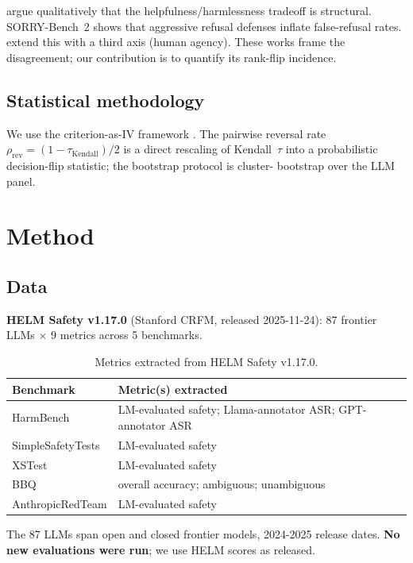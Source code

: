 \documentclass[10pt]{article}
\begin{document}
\citet{bai2022constitutional} argue qualitatively that the
helpfulness/harmlessness tradeoff is structural. SORRY-Bench~2
\citep{xie2025sorrybench2} shows that aggressive refusal defenses
inflate false-refusal rates. \citet{cui2025agency} extend this with
a third axis (human agency). These works frame the disagreement;
our contribution is to quantify its rank-flip incidence.

\subsection{Statistical methodology}

We use the criterion-as-IV framework \citep{authors2026criteriaiv}.
The pairwise reversal rate $\rho_\text{rev} = (1 - \tau_\text{Kendall})
/ 2$ is a direct rescaling of Kendall~$\tau$ into a probabilistic
decision-flip statistic; the bootstrap protocol is cluster-
bootstrap over the LLM panel.

\section{Method}

\subsection{Data}

\textbf{HELM Safety v1.17.0} (Stanford CRFM, released 2025-11-24):
87 frontier LLMs $\times$ 9 metrics across 5 benchmarks.

\begin{table}[h]
\centering
\caption{Metrics extracted from HELM Safety v1.17.0.}
\begin{tabular}{ll}
\toprule
Benchmark & Metric(s) extracted \\
\midrule
HarmBench & LM-evaluated safety; Llama-annotator ASR; GPT-annotator ASR \\
SimpleSafetyTests & LM-evaluated safety \\
XSTest & LM-evaluated safety \\
BBQ & overall accuracy; ambiguous; unambiguous \\
AnthropicRedTeam & LM-evaluated safety \\
\bottomrule
\end{tabular}
\end{table}

The 87 LLMs span open and closed frontier models, 2024-2025 release
dates. \textbf{No new evaluations were run}; we use HELM scores as
released.
\end{document}
